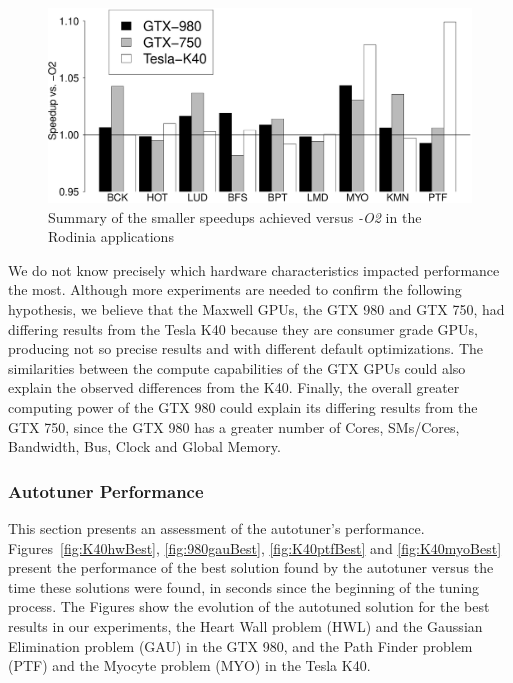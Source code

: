 \begin{figure}[htpb]
    \begin{minipage}{\textwidth}
        \centering
        \includegraphics[scale=.15]{./images/RodiniaSummary_small.eps}
        \caption{Summary of the smaller speedups achieved versus \emph{-O2} in the Rodinia applications}
        \label{fig:rodiniasummarysmall}
    \end{minipage}%
\end{figure}

We do not know precisely which hardware characteristics impacted performance
the most.  Although more experiments are needed to confirm the following
hypothesis, we believe that the Maxwell GPUs, the GTX 980 and GTX 750, had
differing results from the Tesla K40 because they are consumer grade GPUs,
producing not so precise results and with different default optimizations. The
similarities between the compute capabilities of the GTX GPUs could also
explain the observed differences from the K40. Finally, the overall greater
computing power of the GTX 980 could explain its differing results from the GTX
750, since the GTX 980 has a greater number of Cores, SMs/Cores, Bandwidth,
Bus, Clock and Global Memory.

\subsubsection{Autotuner Performance}

This section presents an assessment of the autotuner's performance.
Figures~\ref{fig:K40hwBest}, \ref{fig:980gauBest}, \ref{fig:K40ptfBest} and
\ref{fig:K40myoBest} present the performance of the best solution found by the
autotuner versus the time these solutions were found, in seconds since the
beginning of the tuning process. The Figures show the evolution of the
autotuned solution for the best results in our experiments, the Heart Wall
problem (HWL) and the Gaussian Elimination problem (GAU) in the GTX 980, and
the Path Finder problem (PTF) and the Myocyte problem (MYO) in the Tesla K40.

